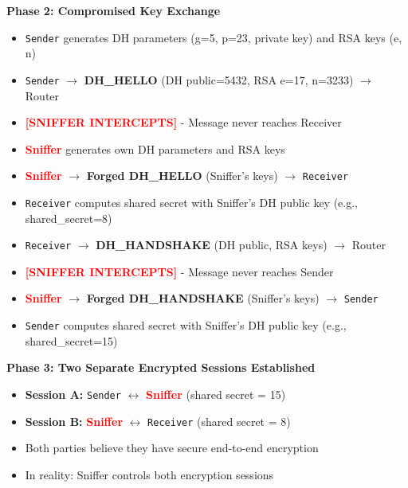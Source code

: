 \documentclass[a4paper,12pt]{extarticle}
\begin{document}
\vspace{0.3cm}
\textbf{Phase 2: Compromised Key Exchange}
\begin{itemize}[leftmargin=1cm]
    \item \texttt{Sender} generates DH parameters (g=5, p=23, private key) and RSA keys (e, n)
    \item \texttt{Sender} $\rightarrow$ \textcolor{maincolor}{\textbf{DH\_HELLO}} (DH public=5432, RSA e=17, n=3233) $\rightarrow$ Router
    \item \textcolor{red}{\textbf{[SNIFFER INTERCEPTS]}} - Message never reaches Receiver
    \item \textcolor{red}{\textbf{Sniffer}} generates own DH parameters and RSA keys
    \item \textcolor{red}{\textbf{Sniffer}} $\rightarrow$ \textcolor{accentcolor}{\textbf{Forged DH\_HELLO}} (Sniffer's keys) $\rightarrow$ \texttt{Receiver}
    \item \texttt{Receiver} computes shared secret with Sniffer's DH public key (e.g., shared\_secret=8)
    \item \texttt{Receiver} $\rightarrow$ \textcolor{maincolor}{\textbf{DH\_HANDSHAKE}} (DH public, RSA keys) $\rightarrow$ Router
    \item \textcolor{red}{\textbf{[SNIFFER INTERCEPTS]}} - Message never reaches Sender
    \item \textcolor{red}{\textbf{Sniffer}} $\rightarrow$ \textcolor{accentcolor}{\textbf{Forged DH\_HANDSHAKE}} (Sniffer's keys) $\rightarrow$ \texttt{Sender}
    \item \texttt{Sender} computes shared secret with Sniffer's DH public key (e.g., shared\_secret=15)
\end{itemize}

\vspace{0.3cm}
\textbf{Phase 3: Two Separate Encrypted Sessions Established}
\begin{itemize}[leftmargin=1cm]
    \item \textbf{Session A:} \texttt{Sender} $\leftrightarrow$ \textcolor{red}{\textbf{Sniffer}} (shared secret = 15)
    \item \textbf{Session B:} \textcolor{red}{\textbf{Sniffer}} $\leftrightarrow$ \texttt{Receiver} (shared secret = 8)
    \item Both parties believe they have secure end-to-end encryption
    \item In reality: Sniffer controls both encryption sessions
\end{itemize}
\end{document}
